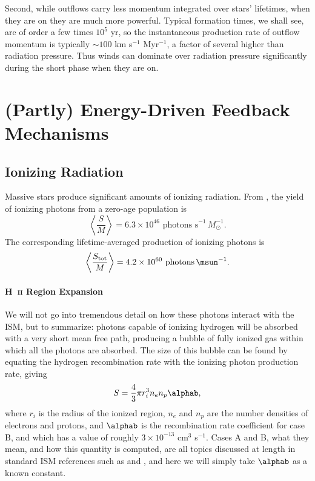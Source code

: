Second, while outflows carry less momentum integrated over stars' lifetimes, when they are on they are much more powerful. Typical formation times, we shall see, are of order a few times $10^5$ yr, so the instantaneous production rate of outflow momentum is typically $\sim 100$ km s$^{-1}$ Myr$^{-1}$, a factor of several higher than radiation pressure. Thus winds can dominate over radiation pressure significantly during the short phase when they are on.

\section{(Partly) Energy-Driven Feedback Mechanisms}

\subsection{Ionizing Radiation}

Massive stars produce significant amounts of ionizing radiation. From \citet{murray10b}, the yield of ionizing photons from a zero-age population is
\begin{equation}
\left\langle\frac{S}{M}\right\rangle = 6.3\times 10^{46}\mbox{ photons s}^{-1}\,M_\odot^{-1}.
\end{equation}
The corresponding lifetime-averaged production of ionizing photons is
\begin{equation}
\left\langle \frac{S_{\rm tot}}{M}\right\rangle = 4.2\times 10^{60}\mbox{ photons}\,\msun^{-1}.
\end{equation}

\paragraph{H~\textsc{ii} Region Expansion}

We will not go into tremendous detail on how these photons interact with the ISM, but to summarize: photons capable of ionizing hydrogen will be absorbed with a very short mean free path, producing a bubble of fully ionized gas within which all the photons are absorbed. The size of this bubble can be found by equating the hydrogen recombination rate with the ionizing photon production rate, giving
\begin{equation}
S = \frac{4}{3} \pi r_i^3 n_e n_p \alphab,
\end{equation}
where $r_i$ is the radius of the ionized region, $n_e$ and $n_p$ are the number densities of electrons and protons, and $\alphab$ is the recombination rate coefficient for case B, and which has a value of roughly $3\times 10^{-13}$ cm$^3$ s$^{-1}$. Cases A and B, what they mean, and how this quantity is computed, are all topics discussed at length in standard ISM references such as \citet{osterbrock06a} and \citet{draine11a}, and here we will simply take $\alphab$ as a known constant.

